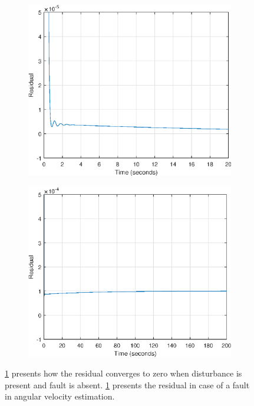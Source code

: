 \begin{figure}[H]
	\begin{subfigure}{0.5\linewidth}
			\centering
		\includegraphics[width=1\linewidth]{figures/nosensfault_res}
		\label{fig:nosensfault_res}		
		\caption{}
	\end{subfigure}
		\begin{subfigure}{0.5\linewidth}
	\centering
\includegraphics[width=1\linewidth]{figures/sensfault_res}
\label{fig:sensfault_res}	
\caption{}
	\end{subfigure}
\caption{\ref{fig:nosensfault_res} presents how the residual converges to zero when disturbance is present and fault is absent. \ref{fig:nosensfault_res} presents the residual in case of a fault in angular velocity estimation.}
\end{figure}

